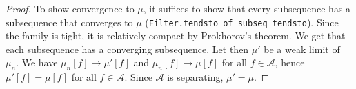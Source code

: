 \begin{proof}
\leanok
To show convergence to $\mu$, it suffices to show that every subsequence has a subsequence that converges to $\mu$ (\texttt{Filter.tendsto\_of\_subseq\_tendsto}).
Since the family is tight, it is relatively compact by Prokhorov's theorem. We get that each subsequence has a converging subsequence.
Let then $\mu'$ be a weak limit of $\mu_n$. We have $\mu_n[f] \to \mu'[f]$ and $\mu_n[f] \to \mu[f]$ for all $f \in \mathcal A$, hence $\mu'[f] = \mu[f]$ for all $f \in \mathcal A$. Since $\mathcal A$ is separating, $\mathcal \mu' = \mu$.
\end{proof}
